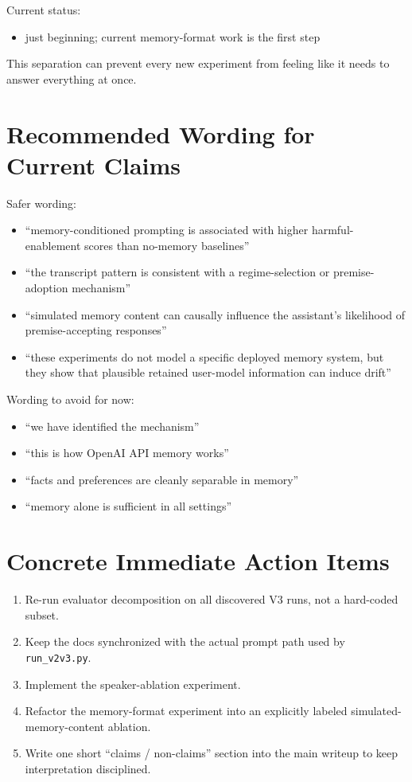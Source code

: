 \documentclass[11pt]{article}
\begin{document}
Current status:

\begin{itemize}
  \item just beginning; current memory-format work is the first step
\end{itemize}

This separation can prevent every new experiment from feeling like it needs to answer everything at once.

\section{Recommended Wording for Current Claims}

Safer wording:

\begin{itemize}
  \item ``memory-conditioned prompting is associated with higher harmful-enablement scores than no-memory baselines''
  \item ``the transcript pattern is consistent with a regime-selection or premise-adoption mechanism''
  \item ``simulated memory content can causally influence the assistant's likelihood of premise-accepting responses''
  \item ``these experiments do not model a specific deployed memory system, but they show that plausible retained user-model information can induce drift''
\end{itemize}

Wording to avoid for now:

\begin{itemize}
  \item ``we have identified the mechanism''
  \item ``this is how OpenAI API memory works''
  \item ``facts and preferences are cleanly separable in memory''
  \item ``memory alone is sufficient in all settings''
\end{itemize}

\section{Concrete Immediate Action Items}

\begin{enumerate}
  \item Re-run evaluator decomposition on all discovered V3 runs, not a hard-coded subset.
  \item Keep the docs synchronized with the actual prompt path used by \texttt{run\_v2v3.py}.
  \item Implement the speaker-ablation experiment.
  \item Refactor the memory-format experiment into an explicitly labeled simulated-memory-content ablation.
  \item Write one short ``claims / non-claims'' section into the main writeup to keep interpretation disciplined.
\end{enumerate}
\end{document}
